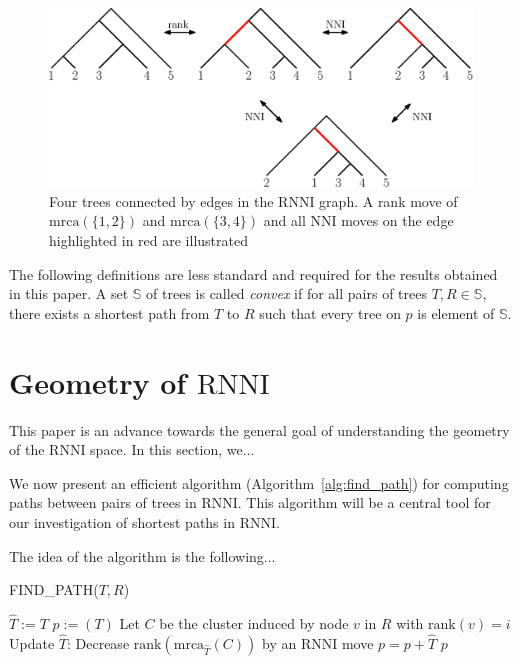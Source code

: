 \documentclass{amsart}
\newcommand{\mrca}{\mathrm{mrca}}
\newcommand{\rank}{\mathrm{rank}}
\newcommand{\nni}{\mathrm{NNI}}
\newcommand{\rnni}{\mathrm{RNNI}}
\begin{document}
\begin{figure}[H]
	\centering
	\includegraphics[width=\textwidth]{RNNI}
	\caption{Four trees connected by edges in the $\rnni$ graph. A rank move of $\mrca(\{1,2\})$ and $\mrca(\{3,4\})$ and all $\nni$ moves on the edge highlighted in red are illustrated}
	\label{fig:RNNI}
\end{figure}


The following definitions are less standard and required for the results obtained in this paper.
A set $\mathbb S$ of trees is called \emph{convex} if for all pairs of trees $T,R \in \mathbb S$, there exists a shortest path from $T$ to $R$ such that every tree on $p$ is element of $\mathbb S$.



\section{Geometry of $\rnni$}

This paper is an advance towards the general goal of understanding the geometry of the $\rnni$ space.
In this section, we...

We now present an efficient algorithm (Algorithm~\ref{alg:find_path}) for computing paths between pairs of trees in $\rnni$.
This algorithm will be a central tool for our investigation of shortest paths in $\rnni$.

The idea of the algorithm is the following...

\begin{algorithm}[H]
\caption{FIND\_PATH($T,R$)}
\label{alg:find_path}
\begin{algorithmic}[1]
	\STATE $\hat{T} := T$
	\STATE $p := (T)$
		\STATE Let $C$ be the cluster induced by node $v$ in $R$ with $\rank(v) = i$
		\WHILE {$\rank(\mrca_{\hat{T}}(C))>i$}
			\STATE Update $\hat{T}$: Decrease $\rank(\mrca_{\hat{T}}(C))$ by an $\rnni$ move \label{alg:line:move_set_down}
			\STATE $p = p+\hat{T}$
		\ENDWHILE
	\ENDFOR
	\RETURN $p$
\end{algorithmic}
\end{algorithm}
\end{document}
